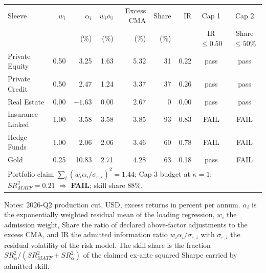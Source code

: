 \documentclass[pdftex,12pt,a4paper]{article}
\begin{document}
\begin{table}[H]
	\label{tab:admission_audit}\vspace*{-0.5\baselineskip}
	\begin{center}
		\footnotesize
		\begin{tabular}{l rrrr rr cc}
			\toprule
			Sleeve & $w_i$ & $\alpha_i$ & $w_i\alpha_i$ & Excess CMA & Share & IR & Cap 1 & Cap 2 \\
			& & (\%) & (\%) & (\%) & (\%) & & IR $\le 0.50$ & Share $\le 50\%$ \\
			\midrule
			Private Equity   & 0.50 & 3.25  & 1.63 & 5.32 & 31 & 0.22 & pass & pass \\
			Private Credit   & 0.50 & 2.47  & 1.24 & 3.37 & 37 & 0.26 & pass & pass \\
			Real Estate      & 0.00 & $-1.63$ & 0.00 & 2.67 & 0  & 0.00 & pass & pass \\
			Insurance-Linked & 1.00 & 3.58  & 3.58 & 3.85 & 93 & 0.83 & FAIL & FAIL \\
			Hedge Funds      & 1.00 & 2.06  & 2.06 & 3.46 & 60 & 0.78 & FAIL & FAIL \\
			Gold             & 0.25 & 10.83 & 2.71 & 4.28 & 63 & 0.18 & pass & FAIL \\
			\midrule
			\multicolumn{9}{l}{Portfolio claim $\sum_i (w_i\alpha_i/\sigma_{\varepsilon,i})^2 = 1.44$; \quad Cap 3 budget at $\kappa=1$: $SR^2_{MATF} = 0.21$ $\Rightarrow$ \textbf{FAIL}; \quad skill share $88\%$.} \\
			\bottomrule
		\end{tabular}
	\end{center}
	\vspace*{-0.5\baselineskip}
	{\footnotesize Notes: 2026-Q2 production cut, USD, excess returns in percent per annum. $\alpha_i$ is the exponentially weighted residual mean of the loading regression, $w_i$ the admission weight, Share the ratio of declared above-factor adjustments to the excess CMA, and IR the admitted information ratio $w_i \alpha_i / \sigma_{\varepsilon,i}$ with $\sigma_{\varepsilon,i}$ the residual volatility of the risk model. The skill share is the fraction $SR^2_{\alpha}/(SR^2_{MATF}+SR^2_{\alpha})$ of the claimed ex-ante squared Sharpe carried by admitted skill.}
\end{table}
\end{document}
